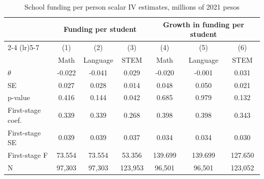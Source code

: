 \begin{table}[!htbp]
\centering
\caption{School funding per person scalar IV estimates, millions of 2021 pesos}
\label{tab:money_scalar_iv_results}
\begin{tabular}{lcccccc}
\toprule
 & \multicolumn{3}{c}{Funding per student} & \multicolumn{3}{c}{Growth in funding per student} \\
\cmidrule(lr){2-4} \cmidrule(lr){5-7}
 & (1) & (2) & (3) & (4) & (5) & (6) \\
 & Math & Language & STEM & Math & Language & STEM \\
\midrule
$\theta$ & -0.022 & -0.041 & 0.029 & -0.020 & -0.001 & 0.031 \\
SE & 0.027 & 0.028 & 0.014 & 0.048 & 0.050 & 0.021 \\
p-value & 0.416 & 0.144 & 0.042 & 0.685 & 0.979 & 0.132 \\
\midrule
First-stage coef. & 0.339 & 0.339 & 0.268 & 0.398 & 0.398 & 0.343 \\
First-stage SE & 0.039 & 0.039 & 0.037 & 0.034 & 0.034 & 0.030 \\
First-stage F & 73.554 & 73.554 & 53.356 & 139.699 & 139.699 & 127.650 \\
N & 97,303 & 97,303 & 123,953 & 96,501 & 96,501 & 123,052 \\
\bottomrule
\end{tabular}
\end{table}
